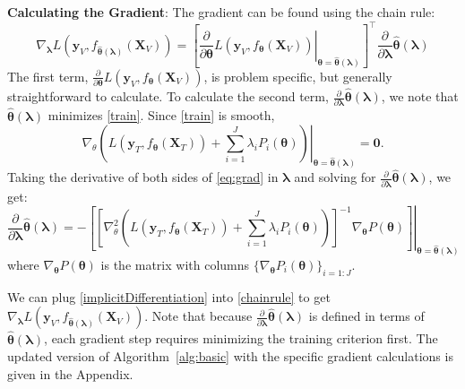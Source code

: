 \documentclass{statsoc}
\begin{document}
\noindent
\textbf{Calculating the Gradient}:
The gradient can be found using the chain rule:
\begin{equation}
\nabla_{\boldsymbol{\lambda}} L \left( \boldsymbol{y}_V, f_{\hat{\boldsymbol \theta}(\boldsymbol{\lambda})}(\boldsymbol{X}_V) \right ) = 
\left [
\left . \frac{\partial}{\partial \boldsymbol \theta} L ( \boldsymbol{y}_V, f_{\boldsymbol \theta}(\boldsymbol{X}_V)) \right |_{\boldsymbol \theta=\hat{\boldsymbol \theta}(\boldsymbol \lambda)}
\right ]^\top 
\frac{\partial}{\partial \boldsymbol{\lambda}} \hat{\boldsymbol \theta}(\boldsymbol{\lambda})
\label{chainrule}
\end{equation}
The first term, $\frac{\partial}{\partial \boldsymbol \theta} L ( \boldsymbol{y}_V, f_{\boldsymbol \theta}(\boldsymbol{X}_V))$, is problem specific, but generally straightforward to calculate. To calculate the second term, $\frac{\partial}{\partial \boldsymbol{\lambda}} \hat{\boldsymbol \theta}(\boldsymbol{\lambda})$, we note that $\hat{\boldsymbol \theta}(\boldsymbol{\lambda})$ minimizes \eqref{train}. Since \eqref{train} is smooth,
\begin{equation}
\nabla_\theta 
\left . \left (
L(\boldsymbol{y}_T, f_{\boldsymbol \theta} (\boldsymbol{X}_T)) +
\sum\limits_{i=1}^J \lambda_i P_i(\boldsymbol \theta)
\right ) \right |_{\boldsymbol \theta = \hat {\boldsymbol \theta}(\boldsymbol{\lambda})}
= \boldsymbol{0}.
\label{eq:grad}
\end{equation}
Taking the derivative of both sides of \eqref{eq:grad} in $\boldsymbol{\lambda}$ and solving for $\frac{\partial}{\partial \boldsymbol{\lambda}} \hat{\boldsymbol \theta}(\boldsymbol{\lambda})$, we get:
\begin{equation}
\frac{\partial}{\partial \boldsymbol{\lambda}} \hat{\boldsymbol \theta}(\boldsymbol{\lambda}) = 
- \left . \left [ \left [
 \nabla_\theta^2 \left (  L \left (\boldsymbol{y}_T, f_{\boldsymbol \theta} (\boldsymbol{X}_T) \right)  +  \sum\limits_{i=1}^J \lambda_i P_i(\boldsymbol \theta)  \right )  \right ]^{-1}
\nabla_{\boldsymbol \theta} P(\boldsymbol \theta)
\right ]
\right |_{\boldsymbol \theta = \hat {\boldsymbol \theta}(\boldsymbol{\lambda})}
\label{implicitDifferentiation}
\end{equation}
where $\nabla_{\boldsymbol \theta} P(\boldsymbol \theta)$ is the matrix with columns $\{\nabla_{\boldsymbol \theta} P_i(\boldsymbol \theta)\}_{i=1:J}$.

We can plug \eqref{implicitDifferentiation} into \eqref{chainrule} to get $\nabla_{\boldsymbol{\lambda}} L \left ( \boldsymbol{y}_V, f_{\hat{\boldsymbol \theta}(\boldsymbol{\lambda})}(\boldsymbol{X}_V) \right )$. Note that because $\frac{\partial}{\partial \boldsymbol{\lambda}} \hat{\boldsymbol \theta}(\boldsymbol{\lambda})$ is defined in terms of $\hat{\boldsymbol \theta}\left(\boldsymbol{\lambda}\right)$, each gradient step requires minimizing the training criterion first. The updated version of Algorithm~\ref{alg:basic} with the specific gradient calculations is given in the Appendix.
\end{document}
